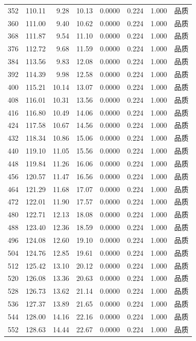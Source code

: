 \begin{longtable}{rrrrrrrr}
352 & 110.11 & 9.28 & 10.13 & 0.0000 & 0.224 & 1.000 & 品质 \\
360 & 111.00 & 9.40 & 10.62 & 0.0000 & 0.224 & 1.000 & 品质 \\
368 & 111.87 & 9.54 & 11.10 & 0.0000 & 0.224 & 1.000 & 品质 \\
376 & 112.72 & 9.68 & 11.59 & 0.0000 & 0.224 & 1.000 & 品质 \\
384 & 113.56 & 9.83 & 12.08 & 0.0000 & 0.224 & 1.000 & 品质 \\
392 & 114.39 & 9.98 & 12.58 & 0.0000 & 0.224 & 1.000 & 品质 \\
400 & 115.21 & 10.14 & 13.07 & 0.0000 & 0.224 & 1.000 & 品质 \\
408 & 116.01 & 10.31 & 13.56 & 0.0000 & 0.224 & 1.000 & 品质 \\
416 & 116.80 & 10.49 & 14.06 & 0.0000 & 0.224 & 1.000 & 品质 \\
424 & 117.58 & 10.67 & 14.56 & 0.0000 & 0.224 & 1.000 & 品质 \\
432 & 118.34 & 10.86 & 15.06 & 0.0000 & 0.224 & 1.000 & 品质 \\
440 & 119.10 & 11.05 & 15.56 & 0.0000 & 0.224 & 1.000 & 品质 \\
448 & 119.84 & 11.26 & 16.06 & 0.0000 & 0.224 & 1.000 & 品质 \\
456 & 120.57 & 11.47 & 16.56 & 0.0000 & 0.224 & 1.000 & 品质 \\
464 & 121.29 & 11.68 & 17.07 & 0.0000 & 0.224 & 1.000 & 品质 \\
472 & 122.01 & 11.90 & 17.57 & 0.0000 & 0.224 & 1.000 & 品质 \\
480 & 122.71 & 12.13 & 18.08 & 0.0000 & 0.224 & 1.000 & 品质 \\
488 & 123.40 & 12.36 & 18.59 & 0.0000 & 0.224 & 1.000 & 品质 \\
496 & 124.08 & 12.60 & 19.10 & 0.0000 & 0.224 & 1.000 & 品质 \\
504 & 124.76 & 12.85 & 19.61 & 0.0000 & 0.224 & 1.000 & 品质 \\
512 & 125.42 & 13.10 & 20.12 & 0.0000 & 0.224 & 1.000 & 品质 \\
520 & 126.08 & 13.36 & 20.63 & 0.0000 & 0.224 & 1.000 & 品质 \\
528 & 126.73 & 13.62 & 21.14 & 0.0000 & 0.224 & 1.000 & 品质 \\
536 & 127.37 & 13.89 & 21.65 & 0.0000 & 0.224 & 1.000 & 品质 \\
544 & 128.00 & 14.16 & 22.16 & 0.0000 & 0.224 & 1.000 & 品质 \\
552 & 128.63 & 14.44 & 22.67 & 0.0000 & 0.224 & 1.000 & 品质 \\

\end{longtable}
